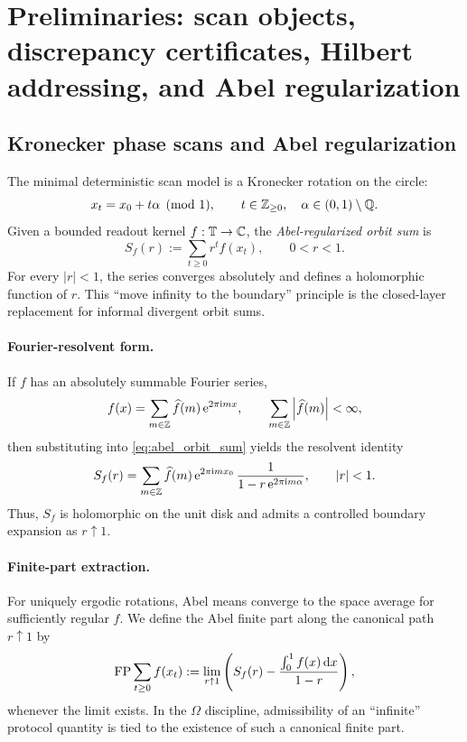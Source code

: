 
\section{Preliminaries: scan objects, discrepancy certificates, Hilbert addressing, and Abel regularization}
\label{sec:preliminaries}

\subsection{Kronecker phase scans and Abel regularization}
\label{sec:kronecker_abel}

The minimal deterministic scan model is a Kronecker rotation on the circle:
\begin{equation}
\label{eq:kronecker_scan}
  x_t=x_0+t\alpha \pmod 1,\qquad t\in\mathbb{Z}_{\ge 0},\quad \alpha\in(0,1)\setminus\mathbb{Q}.
\end{equation}
Given a bounded readout kernel $f:\mathbb{T}\to\mathbb{C}$, the \emph{Abel-regularized orbit sum} is
\begin{equation}
\label{eq:abel_orbit_sum}
  S_f(r):=\sum_{t\ge 0} r^t f(x_t),\qquad 0<r<1.
\end{equation}
For every $|r|<1$, the series converges absolutely and defines a holomorphic function of $r$.
This ``move infinity to the boundary'' principle is the closed-layer replacement for informal divergent orbit sums.

\paragraph{Fourier-resolvent form.}
If $f$ has an absolutely summable Fourier series,
\[
f(x)=\sum_{m\in\mathbb{Z}}\widehat f(m)\,\mathrm{e}^{2\pi \mathrm{i} m x},
\qquad \sum_{m\in\mathbb{Z}}\left\lvert \widehat f(m)\right\rvert<\infty,
\]
then substituting into \eqref{eq:abel_orbit_sum} yields the resolvent identity
\begin{equation}
\label{eq:abel_resolvent}
S_f(r)=\sum_{m\in\mathbb{Z}}\widehat f(m)\,\mathrm{e}^{2\pi \mathrm{i} m x_0}\,\frac{1}{1-r\,\mathrm{e}^{2\pi \mathrm{i} m\alpha}},
\qquad |r|<1.
\end{equation}
Thus, $S_f$ is holomorphic on the unit disk and admits a controlled boundary expansion as $r\uparrow 1$.

\paragraph{Finite-part extraction.}
For uniquely ergodic rotations, Abel means converge to the space average for sufficiently regular $f$.
We define the Abel finite part along the canonical path $r\uparrow 1$ by
\begin{equation}
\label{eq:finite_part_def}
\mathrm{FP}\sum_{t\ge 0} f(x_t)
:=\lim_{r\uparrow 1}\left(
S_f(r)-\frac{\int_0^1 f(x)\,\mathrm{d} x}{1-r}
\right),
\end{equation}
whenever the limit exists.
In the $\Omega$ discipline, admissibility of an ``infinite'' protocol quantity is tied to the existence of such a canonical finite part.


